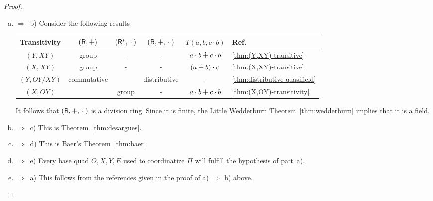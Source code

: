 \begin{proof}${}$
    \begin{enumerate}[a)]
        \item$\Rightarrow$~b) Consider the following results
        \begin{center}\footnotesize
            \begin{tabular}{c|ccccl}
                Transitivity
                    &$(\mathsf R,\dotplus)$
                    &$(\mathsf R^*,{}\cdot{})$
                    &$(\mathsf R,\dotplus,{}\cdot{})$
                    &$T(a,b,c\cdot b)$
                    &Ref.\\
                \hline\rule{0mm}{3mm}
                $(Y,XY)$
                    &group
                    &-
                    &-
                    &$a\cdot b\dotplus c\cdot b$
                    &\ref{thm:(Y,XY)-transitive}\\
                $(X,XY)$
                    &group
                    &-
                    &-
                    &$(a\dotplus b)\cdot c$
                    &\ref{thm:(X,XY)-transitive}\\
                $(Y,OY/XY)$
                    &commutative
                    &
                    &distributive
                    &-
                    &\ref{thm:distributive-quasifield}\\
                $(X,OY)$
                    &
                    &group
                    &-
                    &$a\cdot b\dotplus c\cdot b$
                    &\ref{thm:(X,OY)-transitivity}
            \end{tabular}
        \end{center}
        It follows that $(\mathsf R,\dotplus,{}\cdot{})$ is a division ring. Since it is finite, the Little Wedderburn Theorem~\ref{thm:wedderburn} implies that it is a field.

        \item$\Rightarrow$~c) This is Theorem~\ref{thm:desargues}.

        \item$\Rightarrow$~d) This is Baer's Theorem~\ref{thm:baer}.

        \item$\Rightarrow$~e) Every base quad $O,X,Y,E$ used to coordinatize $\Pi$ will fulfill the hypothesis of part~a).

        \item$\Rightarrow$~a) This follows from the references given in the proof of a) $\Rightarrow$ b) above.
    \end{enumerate}
\end{proof}

